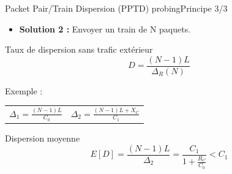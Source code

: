 \documentclass[compress]{beamer}
\begin{document}
\begin{frame}{Packet Pair/Train Dispersion (PPTD) probing}{Principe 3/3}
\begin{itemize}
	\item \textbf{Solution 2 :} Envoyer un {\color{red}train de N paquets}.
\end{itemize}
	\begin{block}{Taux de dispersion sans trafic extérieur}
		$$ D = \frac{(N-1)L}{\Delta_R(N)}$$
	\end{block}
Exemple :
\begin{center}
	\begin{tabular}{cc}
	$ \Delta_{1} = \frac{(N-1)L}{C_{0}}$ & $ \Delta_{2} = \frac{(N-1)L + X_{C}}{C_{1}}$ \\
	\end{tabular}
\end{center}
	\begin{block}{Dispersion moyenne}
		$$ E[D] = \frac{(N-1)L}{\Delta_2} =  \frac{C_1}{1+\frac{R_C}{C_0}} < C_1$$	
	\end{block}

\end{frame}

\end{document}
